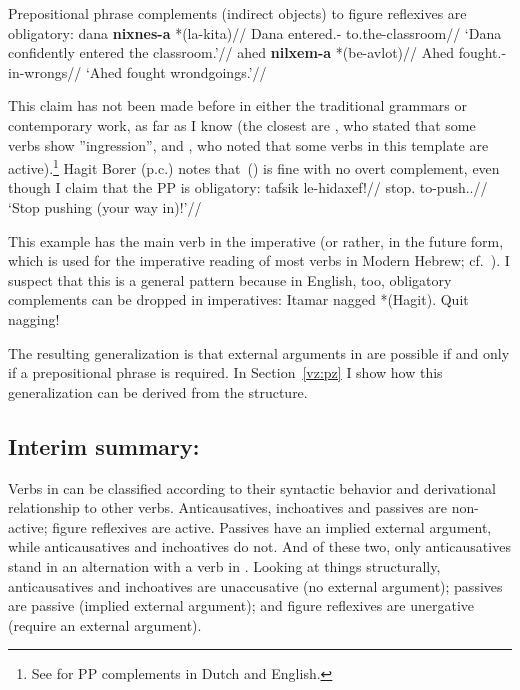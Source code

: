 \pex Prepositional phrase complements (indirect objects) to figure reflexives are obligatory:
	\a \begingl
		\gla dana \textbf{nixnes-a} *(la-kita)//
		\glb Dana entered.- to.the-classroom//
		\glft `Dana confidently entered the classroom.'//
	\endgl
	\a \begingl
		\gla ahed \textbf{nilxem-a} *(be-avlot)//
		\glb Ahed fought.- in-wrongs//
		\glft `Ahed fought wrondgoings.'//
	\endgl
\xe

This claim has not been made before in either the traditional grammars or contemporary work, as far as I know (the closest are \citealt[87]{berman78}, who stated that some verbs show ''ingression'', and \citealt{schwarzwald08}, who noted that some verbs in this template are active).\footnote{See \cite{neeleman97} for PP complements in Dutch and English.} Hagit Borer (p.c.) notes that~(\nextx) is fine with no overt complement, even though I claim that the PP is obligatory:
\ex \begingl
	\gla tafsik le-hidaxef!//
	\glb stop. to-push..//
	\glft `Stop pushing (your way in)!'//
	\endgl
\xe

This example has the main verb in the imperative (or rather, in the future form, which is used for the imperative reading of most verbs in Modern Hebrew; cf.~\citealt{batel02lang}). I suspect that this is a general pattern because in English, too, obligatory complements can be dropped in imperatives:
\pex
	\a Itamar nagged *(Hagit).
	\a Quit nagging!
\xe

The resulting generalization is that external arguments in {\tnif} are possible if and only if a prepositional phrase is required. In Section~\ref{vz:pz} I show how this generalization can be derived from the structure.

	\subsection{Interim summary: \tnif} \label{vz:tnif:sum}
Verbs in {\tnif} can be classified according to their syntactic behavior and derivational relationship to other verbs. Anticausatives, inchoatives and passives are non-active; figure reflexives are active. Passives have an implied external argument, while anticausatives and inchoatives do not. And of these two, only anticausatives stand in an alternation with a verb in {\tkal}. Looking at things structurally, anticausatives and inchoatives are unaccusative (no external argument); passives are passive (implied external argument); and figure reflexives are unergative (require an external argument).

